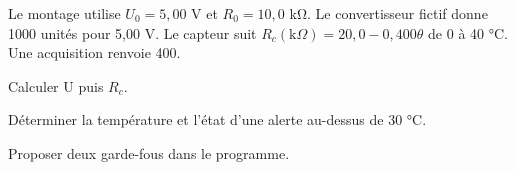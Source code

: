 \label{defi-ex-20-1}
Le montage utilise $U_0=5,00$ V et $R_0=10,0$ kΩ. Le convertisseur fictif donne 1000 unités pour 5,00 V. Le capteur suit $R_c(\mathrm{k}\Omega)=20,0-0,400\theta$ de 0 à 40 °C. Une acquisition renvoie 400.
\begin{questions}
\item Calculer U puis $R_c$.
\item Déterminer la température et l’état d’une alerte au-dessus de 30 °C.
\item Proposer deux garde-fous dans le programme.
\end{questions}
\smallskip{}\hfill{}

